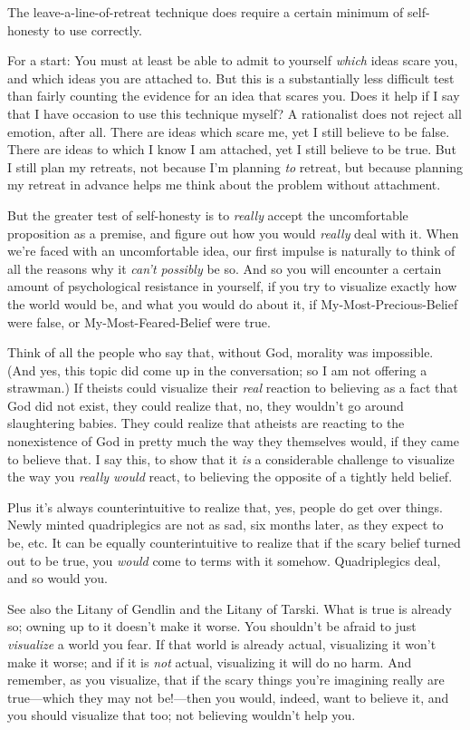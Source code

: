 {
 The leave-a-line-of-retreat technique does require a certain
minimum of self-honesty to use correctly.}

{
 For a start: You must at least be able to admit to yourself
\textit{which} ideas scare you, and which ideas you are attached to.
But this is a substantially less difficult test than fairly counting
the evidence for an idea that scares you. Does it help if I say that I
have occasion to use this technique myself? A rationalist does not
reject all emotion, after all. There are ideas which scare me, yet I
still believe to be false. There are ideas to which I know I am
attached, yet I still believe to be true. But I still plan my retreats,
not because I'm planning \textit{to} retreat, but
because planning my retreat in advance helps me think about the problem
without attachment.}

{
 But the greater test of self-honesty is to \textit{really} accept
the uncomfortable proposition as a premise, and figure out how you
would \textit{really} deal with it. When we're faced
with an uncomfortable idea, our first impulse is naturally to think of
all the reasons why it \textit{can't possibly} be so.
And so you will encounter a certain amount of psychological resistance
in yourself, if you try to visualize exactly how the world would be,
and what you would do about it, if My-Most-Precious-Belief were false,
or My-Most-Feared-Belief were true.}

{
 Think of all the people who say that, without God, morality was
impossible. (And yes, this topic did come up in the conversation; so I
am not offering a strawman.) If theists could visualize their
\textit{real} reaction to believing as a fact that God did not exist,
they could realize that, no, they wouldn't go around
slaughtering babies. They could realize that atheists are reacting to
the nonexistence of God in pretty much the way they themselves would,
if they came to believe that. I say this, to show that it \textit{is} a
considerable challenge to visualize the way you \textit{really would}
react, to believing the opposite of a tightly held belief.}

{
 Plus it's always counterintuitive to realize that,
yes, people do get over things. Newly minted quadriplegics are not as
sad, six months later, as they expect to be, etc. It can be equally
counterintuitive to realize that if the scary belief turned out to be
true, you \textit{would} come to terms with it somehow. Quadriplegics
deal, and so would you.}

{
 See also the Litany of Gendlin and the Litany of Tarski. What is
true is already so; owning up to it doesn't make it
worse. You shouldn't be afraid to just
\textit{visualize} a world you fear. If that world is already actual,
visualizing it won't make it worse; and if it is
\textit{not} actual, visualizing it will do no harm. And remember, as
you visualize, that if the scary things you're
imagining really are true---which they may not be!---then you would,
indeed, want to believe it, and you should visualize that too; not
believing wouldn't help you.}

